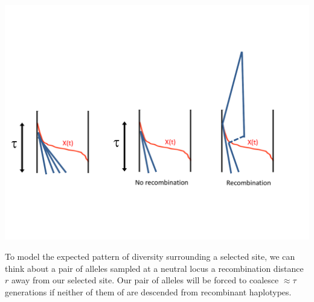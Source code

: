 \begin{marginfigure}
\begin{center}
\includegraphics[width= \textwidth]{figures/Hitchhiking/Recom_coal.pdf}
\end{center}
\caption{} \label{fig:no_recom_coal}
\end{marginfigure}
To model the expected pattern of diversity surrounding a selected site, we can think about a pair
of alleles sampled at a neutral locus a recombination distance $r$
away from our selected site. Our pair of alleles will be forced to
coalesce $\approx \tau$ generations if neither of them of are
descended from recombinant haplotypes.\\

